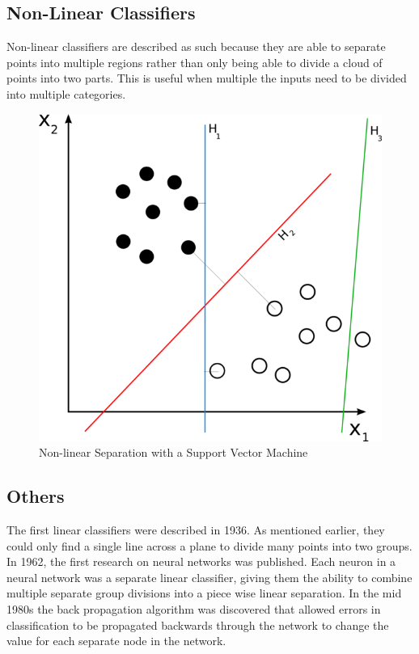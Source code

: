 \documentclass[12pt]{article}
\begin{document}
\subsection{Non-Linear Classifiers}
Non-linear classifiers are described as such because they are able to separate points into multiple regions
rather than only being able to divide a cloud of points into two parts. This is useful when multiple the
inputs need to be divided into multiple categories.
\begin{figure}[center]
  \centering
\includegraphics[scale=.4,natwidth=628,natheight=600]{svm_separating_hyperplanes.png}  
  \caption{Non-linear Separation with a Support Vector Machine}
\end{figure}

\subsection{Others}
The first linear classifiers were described in 1936. \citep{fisher1936use} As mentioned earlier, they could
only find a single line across a plane to divide many points into two groups.  In 1962, the first research on
neural networks was published. Each neuron in a neural network was a separate linear classifier, giving them
the ability to combine multiple separate group divisions into a piece wise linear separation. In the mid 1980s
the back propagation algorithm was discovered that allowed errors in classification to be propagated backwards
through the network to change the value for each separate node in the network. \citep{cortes1995support}
\end{document}
